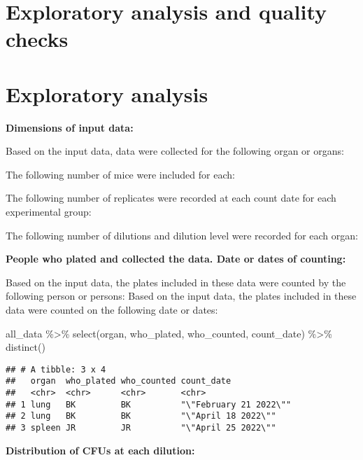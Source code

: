 \documentclass[
]{book}
\newenvironment{Shaded}{\begin{snugshade}}{\end{snugshade}}
\newcommand{\FunctionTok}[1]{\textcolor[rgb]{0.00,0.00,0.00}{#1}}
\newcommand{\NormalTok}[1]{#1}
\newcommand{\SpecialCharTok}[1]{\textcolor[rgb]{0.00,0.00,0.00}{#1}}
\begin{document}
\hypertarget{exploratory-analysis-and-quality-checks}{%
\section{Exploratory analysis and quality checks}\label{exploratory-analysis-and-quality-checks}}

\hypertarget{exploratory-analysis}{%
\section{Exploratory analysis}\label{exploratory-analysis}}

\textbf{Dimensions of input data:}

Based on the input data, data were collected for the following organ or
organs:

The following number of mice were included for each:

The following number of replicates were recorded at each count date for
each experimental group:

The following number of dilutions and dilution level were recorded for
each organ:

\textbf{People who plated and collected the data. Date or dates of counting:}

Based on the input data, the plates included in these data were counted by
the following person or persons:
Based on the input data, the plates included in these data were counted on
the following date or dates:

\begin{Shaded}
\begin{Highlighting}[]
\NormalTok{all\_data }\SpecialCharTok{\%\textgreater{}\%}
  \FunctionTok{select}\NormalTok{(organ, who\_plated, who\_counted, count\_date) }\SpecialCharTok{\%\textgreater{}\%}
  \FunctionTok{distinct}\NormalTok{()}
\end{Highlighting}
\end{Shaded}

\begin{verbatim}
## # A tibble: 3 x 4
##   organ  who_plated who_counted count_date            
##   <chr>  <chr>      <chr>       <chr>                 
## 1 lung   BK         BK          "\"February 21 2022\""
## 2 lung   BK         BK          "\"April 18 2022\""   
## 3 spleen JR         JR          "\"April 25 2022\""
\end{verbatim}

\textbf{Distribution of CFUs at each dilution:}
\end{document}
